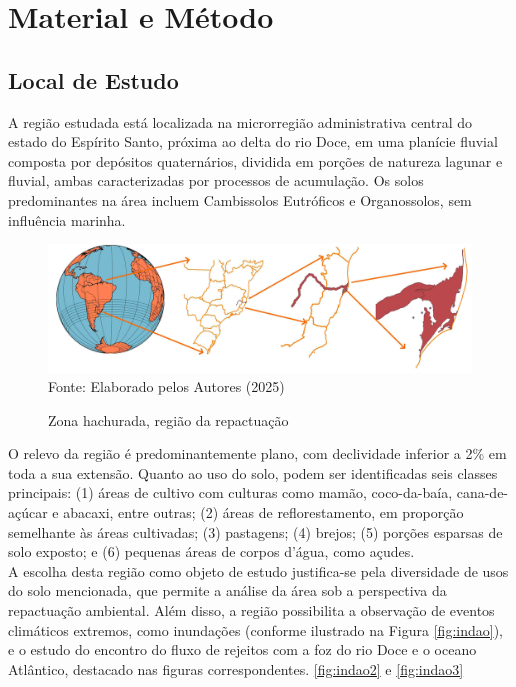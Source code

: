 
\section{Material e Método}

 \subsection{Local de Estudo}

  \hspace*{1.25 cm}  A região estudada está localizada na microrregião administrativa central do estado do Espírito Santo, próxima ao delta do rio Doce, em uma planície fluvial composta por depósitos quaternários, dividida em porções de natureza lagunar e fluvial, ambas caracterizadas por processos de acumulação. Os solos predominantes na área incluem Cambissolos Eutróficos e Organossolos, sem influência marinha.\\
     \begin{figure}
	\begin{center}
		\centering \small \caption{Zona hachurada, região da repactuação}
		\includegraphics[width=0.96\linewidth]{FIGURAS/Localizacao}
		\label{fig:localizacado}\\{Fonte: Elaborado pelos Autores (2025)}
	\end{center}
\end{figure}
  \hspace*{1.25 cm}  O relevo da região é predominantemente plano, com declividade inferior a 2\% em toda a sua extensão. Quanto ao uso do solo, podem ser identificadas seis classes principais: (1) áreas de cultivo com culturas como mamão, coco-da-baía, cana-de-açúcar e abacaxi, entre outras; (2) áreas de reflorestamento, em proporção semelhante às áreas cultivadas; (3) pastagens; (4) brejos; (5) porções esparsas de solo exposto; e (6) pequenas áreas de corpos d’água, como açudes. \\
%
  \hspace*{1.25 cm} A escolha desta região como objeto de estudo justifica-se pela diversidade de usos do solo mencionada, que permite a análise da área sob a perspectiva da repactuação ambiental. Além disso, a região possibilita a observação de eventos climáticos extremos, como inundações (conforme ilustrado na Figura \ref{fig:indao}), e o estudo do encontro do fluxo de rejeitos com a foz do rio Doce e o oceano Atlântico, destacado nas figuras correspondentes. \ref{fig:indao2} e \ref{fig:indao3}\\  
